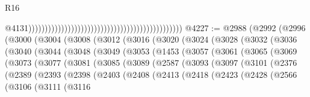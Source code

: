 \begin{lexlean}{R16}
\begin{coremodule}
                                                                                                  @4131)))))))))))))))))))))))))))))))))))))))))))))))
@4227 := @2988
    (@2992
      (@2996
        (@3000
          (@3004
            (@3008
              (@3012
                (@3016
                  (@3020
                    (@3024
                      (@3028
                        (@3032
                          (@3036
                            (@3040
                              (@3044
                                (@3048
                                  (@3049
                                    (@3053
                                      (@1453
                                        (@3057
                                          (@3061
                                            (@3065
                                              (@3069
                                                (@3073
                                                  (@3077
                                                    (@3081
                                                      (@3085
                                                        (@3089
                                                          (@2587
                                                            (@3093
                                                              (@3097
                                                                (@3101
                                                                  (@2376
                                                                    (@2389
                                                                      (@2393
                                                                        (@2398
                                                                          (@2403
                                                                            (@2408
                                                                              (@2413
                                                                                (@2418
                                                                                  (@2423
                                                                                    (@2428
                                                                                      (@2566
                                                                                        (@3106
                                                                                          (@3111
                                                                                            (@3116

\end{coremodule}
\end{lexlean}
